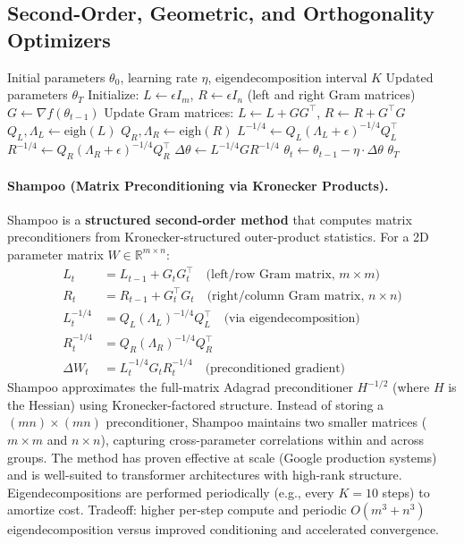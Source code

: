 \documentclass[11pt,a4paper]{article}
\begin{document}
\subsection{Second-Order, Geometric, and Orthogonality Optimizers}

\begin{algorithm}[H]
\caption{Shampoo (Matrix Preconditioning via Kronecker Products)}
\label{alg:shampoo}
\begin{algorithmic}[1]
\Require Initial parameters $\theta_0$, learning rate $\eta$, eigendecomposition interval $K$
\Ensure Updated parameters $\theta_T$
\State Initialize: $L \gets \epsilon I_m$, $R \gets \epsilon I_n$ (left and right Gram matrices)
    \State $G \gets \nabla f(\theta_{t-1})$ 
    \State Update Gram matrices: $L \gets L + G G^\top$, $R \gets R + G^\top G$
        \State $Q_L, \Lambda_L \gets \text{eigh}(L)$ 
        \State $Q_R, \Lambda_R \gets \text{eigh}(R)$ 
        \State $L^{-1/4} \gets Q_L (\Lambda_L + \epsilon)^{-1/4} Q_L^\top$
        \State $R^{-1/4} \gets Q_R (\Lambda_R + \epsilon)^{-1/4} Q_R^\top$
    \EndIf
    \State $\Delta \theta \gets L^{-1/4} G R^{-1/4}$ 
    \State $\theta_t \gets \theta_{t-1} - \eta \cdot \Delta \theta$
\EndFor
\Return $\theta_T$
\end{algorithmic}
\end{algorithm}

\paragraph{Shampoo (Matrix Preconditioning via Kronecker Products).}
Shampoo is a \textbf{structured second-order method} that computes matrix preconditioners from Kronecker-structured outer-product statistics. For a 2D parameter matrix $W \in \mathbb{R}^{m \times n}$:
\begin{align}
L_t &= L_{t-1} + G_t G_t^\top \quad\text{(left/row Gram matrix, $m \times m$)} \\
R_t &= R_{t-1} + G_t^\top G_t \quad\text{(right/column Gram matrix, $n \times n$)} \\
L_t^{-1/4} &= Q_L (\Lambda_L)^{-1/4} Q_L^\top \quad\text{(via eigendecomposition)} \\
R_t^{-1/4} &= Q_R (\Lambda_R)^{-1/4} Q_R^\top \\
\Delta W_t &= L_t^{-1/4} G_t R_t^{-1/4} \quad\text{(preconditioned gradient)}
\end{align}
Shampoo approximates the full-matrix Adagrad preconditioner $H^{-1/2}$ (where $H$ is the Hessian) using Kronecker-factored structure. Instead of storing a $(mn) \times (mn)$ preconditioner, Shampoo maintains two smaller matrices ($m \times m$ and $n \times n$), capturing cross-parameter correlations within and across groups. The method has proven effective at scale (Google production systems) and is well-suited to transformer architectures with high-rank structure. Eigendecompositions are performed periodically (e.g., every $K=10$ steps) to amortize cost. Tradeoff: higher per-step compute and periodic $O(m^3 + n^3)$ eigendecomposition versus  improved conditioning and accelerated convergence.
\end{document}
